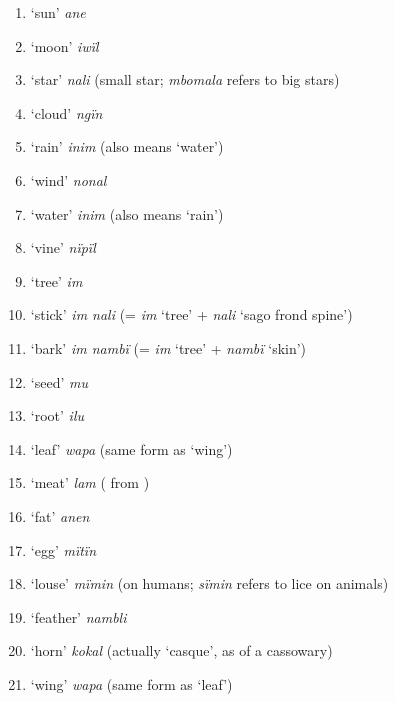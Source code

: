 \begin{enumerate}[noitemsep, label={\arabic*}, align=left, widest=190, labelsep=1ex,leftmargin=*]
\item  ‘sun’ \textit{ane}

\item  ‘moon’ \textit{iwïl}

\item  ‘star’ \textit{nali} (small star; \textit{mbomala} refers to big stars)

\item  ‘cloud’ \textit{ngïn}

\item  ‘rain’ \textit{inim} (also means ‘water’)

\item  ‘wind’ \textit{nonal}

\item  ‘water’ \textit{inim} (also means ‘rain’)

\item  ‘vine’ \textit{nïpïl}

\item  ‘tree’ \textit{im}

\item  ‘stick’ \textit{im nali} (= \textit{im} ‘tree’ + \textit{nali} ‘sago frond spine’)

\item  ‘bark’ \textit{im nambï} (= \textit{im} ‘tree’ + \textit{nambï} ‘skin’)

\item  ‘seed’ \textit{mu}

\item  ‘root’ \textit{ilu}

\item  ‘leaf’ \textit{wapa} (same form as ‘wing’)

\item  ‘meat’ \textit{lam} ( from )

\item  ‘fat’ \textit{anen}

\item  ‘egg’ \textit{mïtïn}

\item  ‘louse’ \textit{mïmin} (on humans; \textit{sïmin} refers to lice on animals)

\item  ‘feather’ \textit{nambli}

\item  ‘horn’ \textit{kokal} (actually ‘casque’, as of a cassowary)

\item  ‘wing’ \textit{wapa} (same form as ‘leaf’)


\end{enumerate}
